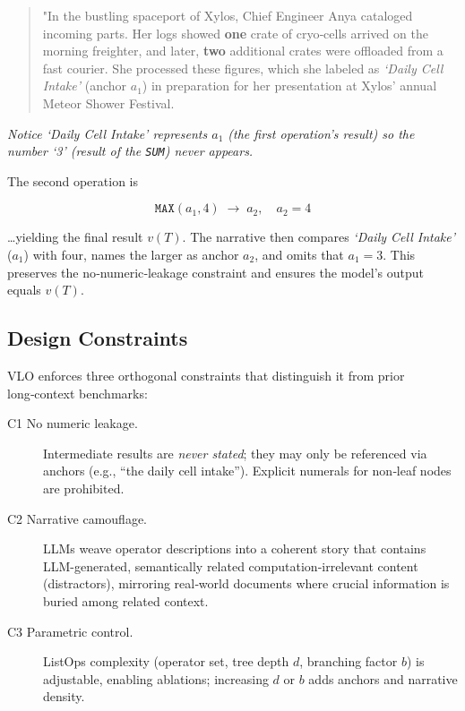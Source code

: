 \documentclass{article}
\begin{document}
\begin{quote}
  "In the bustling spaceport of Xylos, Chief Engineer Anya cataloged incoming parts. Her logs showed \textbf{one} crate of cryo‐cells arrived on the morning freighter, and later, \textbf{two} additional crates were offloaded from a fast courier. She processed these figures, which she labeled as \textit{`Daily Cell Intake'} (anchor $a_1$) in preparation for her presentation at Xylos' annual Meteor Shower Festival.
\end{quote}

\noindent\hspace{3.5em}\begin{minipage}{\dimexpr\textwidth-7em}
  \textit{Notice `Daily Cell Intake' represents $a_1$ (the first operation's result) so the number `3' (result of the \texttt{SUM}) never appears.}
\end{minipage}

The second operation is

\[
  \texttt{MAX}(a_1,4) \;\to\; a_2,\quad a_2 = 4
\]

…yielding the final result $v(T)$. The narrative then compares \textit{`Daily Cell Intake'} ($a_1$) with four, names the larger as anchor $a_2$, and omits that $a_1=3$. This preserves the no‐numeric‐leakage constraint and ensures the model's output equals $v(T)$.

\subsection{Design Constraints}
\label{subsec:design-constraints}
VLO enforces three orthogonal constraints that distinguish it from prior long‑context benchmarks:
\begin{description}
  \item[C1 No numeric leakage.] Intermediate results are \emph{never stated}; they may only be referenced via anchors (e.g., ``the daily cell intake''). Explicit numerals for non‑leaf nodes are prohibited.
  \item[C2 Narrative camouflage.] LLMs weave operator descriptions into a coherent story that contains LLM-generated, semantically related computation‑irrelevant content (distractors), mirroring real‑world documents where crucial information is buried among related context.
  \item[C3 Parametric control.] ListOps complexity (operator set, tree depth $d$, branching factor $b$) is adjustable, enabling ablations; increasing $d$ or $b$ adds anchors and narrative density.
\end{description}
\end{document}
